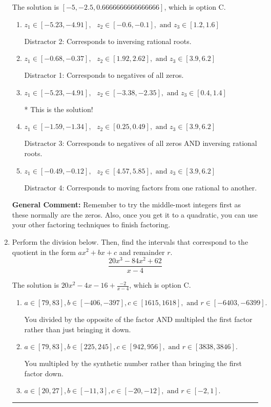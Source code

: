 \documentclass{extbook}[14pt]
\newcommand{\litem}[1]{\item #1

\rule{\textwidth}{0.4pt}}
\begin{document}
\begin{enumerate}
{The solution is \( [-5, -2.5, 0.6666666666666666] \), which is option C.\begin{enumerate}[label=\Alph*.]
\item \( z_1 \in [-5.23, -4.91], \text{   }  z_2 \in [-0.6, -0.1], \text{   and   } z_3 \in [1.2, 1.6] \)

 Distractor 2: Corresponds to inversing rational roots.
\item \( z_1 \in [-0.68, -0.37], \text{   }  z_2 \in [1.92, 2.62], \text{   and   } z_3 \in [3.9, 6.2] \)

 Distractor 1: Corresponds to negatives of all zeros.
\item \( z_1 \in [-5.23, -4.91], \text{   }  z_2 \in [-3.38, -2.35], \text{   and   } z_3 \in [0.4, 1.4] \)

* This is the solution!
\item \( z_1 \in [-1.59, -1.34], \text{   }  z_2 \in [0.25, 0.49], \text{   and   } z_3 \in [3.9, 6.2] \)

 Distractor 3: Corresponds to negatives of all zeros AND inversing rational roots.
\item \( z_1 \in [-0.49, -0.12], \text{   }  z_2 \in [4.57, 5.85], \text{   and   } z_3 \in [3.9, 6.2] \)

 Distractor 4: Corresponds to moving factors from one rational to another.
\end{enumerate}

\textbf{General Comment:} Remember to try the middle-most integers first as these normally are the zeros. Also, once you get it to a quadratic, you can use your other factoring techniques to finish factoring.
}
\litem{
Perform the division below. Then, find the intervals that correspond to the quotient in the form $ax^2+bx+c$ and remainder $r$.
\[ \frac{20x^{3} -84 x^{2} + 62}{x -4} \]

The solution is \( 20x^{2} -4 x -16 + \frac{-2}{x -4} \), which is option C.\begin{enumerate}[label=\Alph*.]
\item \( a \in [79, 83], b \in [-406, -397], c \in [1615, 1618], \text{ and } r \in [-6403, -6399]. \)

 You divided by the opposite of the factor AND multipled the first factor rather than just bringing it down.
\item \( a \in [79, 83], b \in [225, 245], c \in [942, 956], \text{ and } r \in [3838, 3846]. \)

 You multipled by the synthetic number rather than bringing the first factor down.
\item \( a \in [20, 27], b \in [-11, 3], c \in [-20, -12], \text{ and } r \in [-2, 1]. \)


\end{enumerate}}
\end{enumerate}
\end{document}
